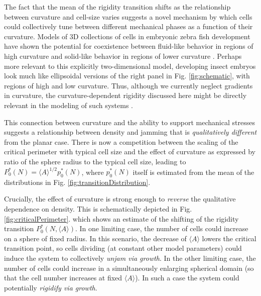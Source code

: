 \documentclass[aps,pre,reprint,superscriptaddress,nofootinbib]{revtex4-2}
\begin{document}
The fact that the mean of the rigidity transition shifts as the relationship between curvature and cell-size varies suggests a novel mechanism by which cells could collectively tune between different mechanical phases as a function of their curvature. Models of 3D collections of cells in embryonic zebra fish development have shown the potential for coexistence between fluid-like behavior in regions of high curvature and solid-like behavior in regions of lower curvature \cite{mongera2018fluid}. Perhaps more relevant to this explicitly two-dimensional model, developing insect embryos look much like ellipsoidal versions of the right panel in Fig. \ref{fig:schematic}, with regions of high and low curvature. Thus, although we currently neglect gradients in curvature, the curvature-dependent rigidity discussed here might be directly relevant in the modeling of such systems \cite{jain2019regionalized}.

This connection between curvature and the ability to support mechanical stresses suggests a relationship between density and jamming that is \emph{qualitatively different} from the planar case. There is now a competition between the scaling of the critical perimeter with typical cell size and the effect of curvature as expressed by ratio of the sphere radius to the typical cell size, leading to $P_0^*(N) = \langle A\rangle^{1/2} p_0^*(N)$, where $p_0^*(N)$ itself is estimated from the mean of the distributions in Fig. \ref{fig:transitionDistribution}.

Crucially, the effect of curvature is strong enough to \emph{reverse} the qualitative dependence on density. This is schematically depicted in Fig. \ref{fig:criticalPerimeter}. which shows an estimate of the shifting of the rigidity transition $P_0^*(N,\langle A\rangle)$. In one limiting case, the number of cells could increase on a sphere of fixed radius. In this scenario, the decrease of $\langle A \rangle$ lowers the critical transition point, so cells dividing (at constant other model parameters) could induce the system to collectively \emph{unjam via growth}. In the other limiting case, the number of cells could increase in a simultaneously enlarging spherical domain (so that the cell number increases at fixed $\langle A \rangle$). In such a case the system could potentially \emph{rigidify via growth}. 
\end{document}
